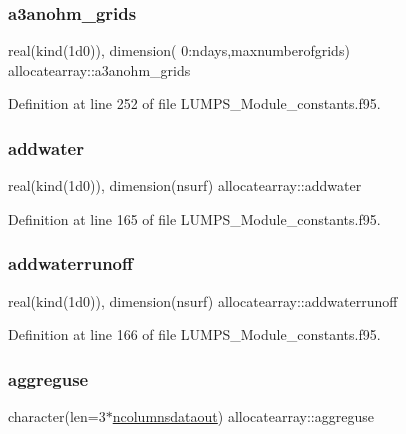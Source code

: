 \subsubsection{\texorpdfstring{a3anohm\+\_\+grids}{a3anohm\_grids}}
{\footnotesize\ttfamily real(kind(1d0)), dimension( 0\+:ndays,maxnumberofgrids) allocatearray\+::a3anohm\+\_\+grids}



Definition at line 252 of file L\+U\+M\+P\+S\+\_\+\+Module\+\_\+constants.\+f95.

\mbox{\label{namespaceallocatearray_a01b956e9e6112af17136ffd957d4c481}} 
\subsubsection{\texorpdfstring{addwater}{addwater}}
{\footnotesize\ttfamily real(kind(1d0)), dimension(nsurf) allocatearray\+::addwater}



Definition at line 165 of file L\+U\+M\+P\+S\+\_\+\+Module\+\_\+constants.\+f95.

\mbox{\label{namespaceallocatearray_aa390fe06fd3fcecf38ff94ac0367e04c}} 
\subsubsection{\texorpdfstring{addwaterrunoff}{addwaterrunoff}}
{\footnotesize\ttfamily real(kind(1d0)), dimension(nsurf) allocatearray\+::addwaterrunoff}



Definition at line 166 of file L\+U\+M\+P\+S\+\_\+\+Module\+\_\+constants.\+f95.

\mbox{\label{namespaceallocatearray_a809990af6a37f51ec5b65de594ab5895}} 
\subsubsection{\texorpdfstring{aggreguse}{aggreguse}}
{\footnotesize\ttfamily character(len=3$\ast$\hyperlink{namespaceallocatearray_a9408900bed6c87ed095d2c688c1506a0}{ncolumnsdataout}) allocatearray\+::aggreguse}



